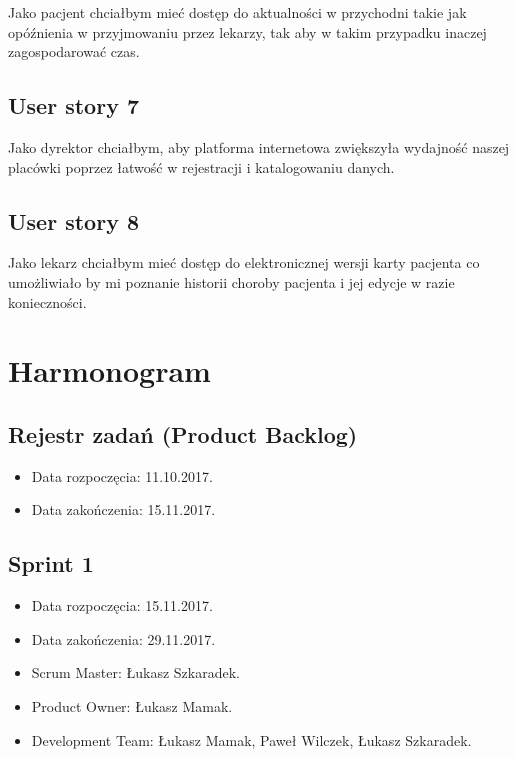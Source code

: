 \documentclass[a4paper]{article} \usepackage{polski} \usepackage[cp1250]{inputenc} \usepackage{url}
\begin{document}
Jako pacjent chciałbym mieć dostęp do aktualności w przychodni takie jak opóźnienia w przyjmowaniu przez lekarzy, tak aby w takim przypadku inaczej zagospodarować czas.

\subsection{User story 7}


Jako dyrektor chciałbym, aby platforma internetowa zwiększyła wydajność naszej placówki poprzez łatwość w rejestracji i katalogowaniu danych.

\subsection{User story 8}


Jako lekarz chciałbym mieć dostęp do elektronicznej wersji karty pacjenta co umożliwiało by mi poznanie historii choroby pacjenta i jej edycje w razie konieczności.


\section{Harmonogram}

\subsection{Rejestr zadań (Product Backlog)}


\begin{itemize} \item Data rozpoczęcia: 11.10.2017. \item Data zakończenia: 15.11.2017. \end{itemize}

\subsection{Sprint 1}


\begin{itemize} \item Data rozpoczęcia: 15.11.2017. \item Data zakończenia: 29.11.2017. \item Scrum Master: Łukasz Szkaradek. \item Product Owner: Łukasz Mamak. \item Development Team: Łukasz Mamak, Paweł Wilczek, Łukasz Szkaradek. \end{itemize}
\end{document}
